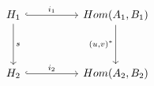 \documentclass{article}
\theoremstyle{definition}
\begin{document}
\[\begin{tikzcd}
	{H_1} && {Hom(A_1,B_1)} \\
	\\
	{H_2} && {Hom(A_2,B_2)}
	\arrow["s", from=1-1, to=3-1]
	\arrow["i_1", hook, from=1-1, to=1-3]
	\arrow["i_2", hook, from=3-1, to=3-3]
	\arrow["{(u, v)^*}"', from=1-3, to=3-3]
\end{tikzcd}\]
\end{document}

